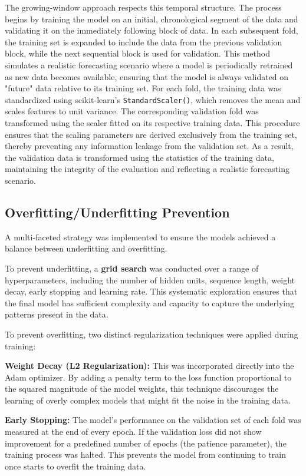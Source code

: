\documentclass[conference, 10pt]{IEEEtran}
\begin{document}
The growing-window approach respects this temporal structure. The process begins by training the model on an initial,
chronological segment of the data and validating it on the immediately following block of data. In each subsequent fold,
the training set is expanded to include the data from the previous validation block, while the next sequential block is
used for validation. This method simulates a realistic forecasting scenario where a model is periodically retrained as
new data becomes available, ensuring that the model is always validated on "future" data relative to its training set.
For each fold, the training data was standardized using scikit-learn's \texttt{StandardScaler()}, which removes the mean
and scales features to unit variance. The corresponding validation fold was transformed using the scaler fitted on its
respective training data. This procedure ensures that the scaling parameters are derived exclusively from the training
set, thereby preventing any information leakage from the validation set. As a result, the validation data is transformed
using the statistics of the training data, maintaining the integrity of the evaluation and reflecting a realistic
forecasting scenario.

\subsection{Overfitting/Underfitting Prevention}
A multi-faceted strategy was implemented to ensure the models achieved a balance between underfitting and overfitting.

To prevent underfitting, a \textbf{grid search} was conducted over a range of hyperparameters, including the number of hidden
units, sequence length, weight decay, early stopping and learning rate. This systematic exploration ensures that the
final model has sufficient complexity and capacity to capture the underlying patterns present in the data.

To prevent overfitting, two distinct regularization techniques were applied during training:

\textbf{Weight Decay (L2 Regularization):} This was incorporated directly into the Adam optimizer. By adding a penalty term to
the loss function proportional to the squared magnitude of the model weights, this technique discourages the learning of
overly complex models that might fit the noise in the training data.

\textbf{Early Stopping:} The model's performance on the validation set of each fold was measured at the end of every epoch. If
the validation loss did not show improvement for a predefined number of epochs (the patience parameter), the training
process was halted. This prevents the model from continuing to train once starts to overfit the training data.
\end{document}

